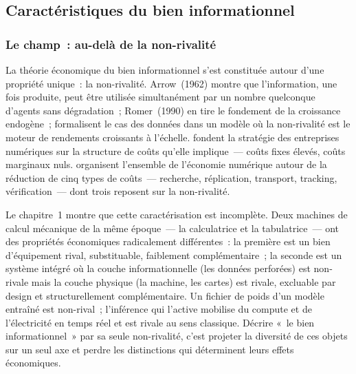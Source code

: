 
\subsection{Caractéristiques du bien informationnel}\label{sec:d1-bien}

\subsubsection{Le champ~: au-delà de la non-rivalité}

\markNEO
La théorie économique du bien informationnel s'est constituée autour d'une propriété unique~: la non-rivalité. Arrow~(1962) montre que l'information, une fois produite, peut être utilisée simultanément par un nombre quelconque d'agents sans dégradation~; Romer~(1990) en tire le fondement de la croissance endogène~; \textcite{jones_nonrivalry_2020} formalisent le cas des données dans un modèle où la non-rivalité est le moteur de rendements croissants à l'échelle. \textcite{shapiro_information_1999} fondent la stratégie des entreprises numériques sur la structure de coûts qu'elle implique~--- coûts fixes élevés, coûts marginaux nuls. \textcite{goldfarb_digital_2019} organisent l'ensemble de l'économie numérique autour de la réduction de cinq types de coûts~--- recherche, réplication, transport, tracking, vérification~--- dont trois reposent sur la non-rivalité. 

Le chapitre~1 montre que cette caractérisation est incomplète. Deux machines de calcul mécanique de la même époque~--- la calculatrice et la tabulatrice~--- ont des propriétés économiques radicalement différentes~: la première est un bien d'équipement rival, substituable, faiblement complémentaire~; la seconde est un système intégré où la couche informationnelle (les données perforées) est non-rivale mais la couche physique (la machine, les cartes) est rivale, excluable par design et structurellement complémentaire. Un fichier de poids d'un modèle entraîné est non-rival~; l'inférence qui l'active mobilise du compute et de l'électricité en temps réel et est rivale au sens classique. Décrire «~le bien informationnel~» par sa seule non-rivalité, c'est projeter la diversité de ces objets sur un seul axe et perdre les distinctions qui déterminent leurs effets économiques.

